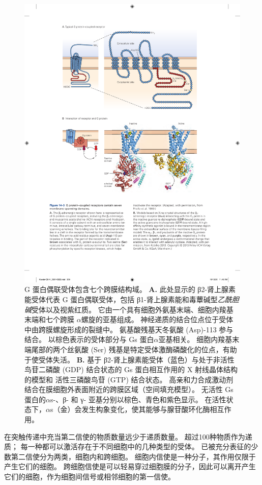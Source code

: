 \begin{figure}[htbp]
	\centering
	\includegraphics[width=0.75\linewidth]{chap14/fig_14_3}
	\caption{G 蛋白偶联受体包含七个跨膜结构域。
		\textbf{A.} 此处显示的 β2-肾上腺素能受体代表 G 蛋白偶联受体，包括 β1-肾上腺素能和毒蕈碱型\textit{乙酰胆碱}受体以及视紫红质。
		它由一个具有细胞外氨基末端、细胞内羧基末端和七个跨膜 $\alpha$螺旋的亚基组成。
		神经递质的结合位点位于受体中由跨膜螺旋形成的裂缝中。
		氨基酸残基天冬氨酸 (Asp)-113 参与结合。
		以棕色表示的受体部分与 Gs 蛋白$\alpha$亚基相关。
		细胞内羧基末端尾部的两个丝氨酸 (Ser) 残基是特定受体激酶磷酸化的位点，有助于使受体失活\cite{frielle1989beta}。
		\textbf{B.} 基于 β2-肾上腺素能受体（蓝色）与处于非活性鸟苷二磷酸 (GDP) 结合状态的 Gs 蛋白相互作用的 X 射线晶体结构的模型和 活性三磷酸鸟苷 (GTP) 结合状态。
		高亲和力合成激动剂结合在膜细胞外表面附近的跨膜区域（空间填充模型）。
		无活性 Gs 蛋白的$\alpha$s-、β- 和 γ- 亚基分别以棕色、青色和紫色显示。
		在活性状态下，$\alpha$s（金）会发生构象变化，使其能够与腺苷酸环化酶相互作用\cite{kobilka2013structural}。}
	\label{fig:14_3}
\end{figure}


在突触传递中充当第二信使的物质数量远少于递质数量。 超过100种物质作为递质；
每一种都可以激活存在于不同细胞中的几种类型的受体。
已被充分表征的少数第二信使分为两类，细胞内和跨细胞。
细胞内信使是一种分子，其作用仅限于产生它们的细胞。 
跨细胞信使是可以轻易穿过细胞膜的分子，因此可以离开产生它们的细胞，作为细胞间信号或相邻细胞的第一信使。


